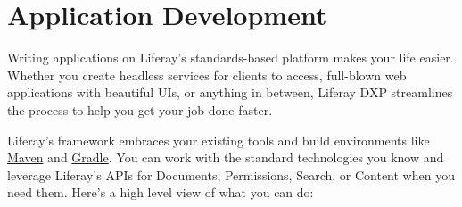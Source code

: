 \chapter{Application Development}\label{application-development}

Writing applications on Liferay's standards-based platform makes your
life easier. Whether you create headless services for clients to access,
full-blown web applications with beautiful UIs, or anything in between,
Liferay DXP streamlines the process to help you get your job done
faster.

Liferay's framework embraces your existing tools and build environments
like \href{https://maven.apache.org}{Maven} and
\href{https://gradle.org}{Gradle}. You can work with the standard
technologies you know and leverage Liferay's APIs for Documents,
Permissions, Search, or Content when you need them. Here's a high level
view of what you can do:

